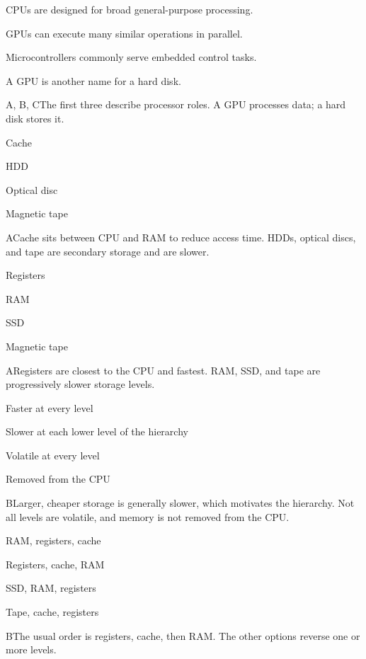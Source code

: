 \begin{enumerate}[label=\textbf{Q\arabic*.}, leftmargin=*]
  {\item CPUs are designed for broad general-purpose processing.
   \item GPUs can execute many similar operations in parallel.
   \item Microcontrollers commonly serve embedded control tasks.
   \item A GPU is another name for a hard disk.}
  {A, B, C}{The first three describe processor roles. A GPU processes data; a hard disk stores it.}
\fi
\ifnum{}
  {\item Cache
   \item HDD
   \item Optical disc
   \item Magnetic tape}
  {A}{Cache sits between CPU and RAM to reduce access time. HDDs, optical discs, and tape are secondary storage and are slower.}
  {\item Registers
   \item RAM
   \item SSD
   \item Magnetic tape}
  {A}{Registers are closest to the CPU and fastest. RAM, SSD, and tape are progressively slower storage levels.}
  {\item Faster at every level
   \item Slower at each lower level of the hierarchy
   \item Volatile at every level
   \item Removed from the CPU}
  {B}{Larger, cheaper storage is generally slower, which motivates the hierarchy. Not all levels are volatile, and memory is not removed from the CPU.}
  {\item RAM, registers, cache
   \item Registers, cache, RAM
   \item SSD, RAM, registers
   \item Tape, cache, registers}
  {B}{The usual order is registers, cache, then RAM. The other options reverse one or more levels.}

\end{enumerate}
